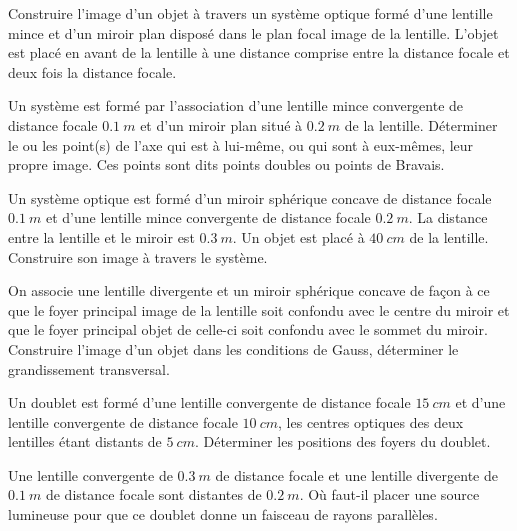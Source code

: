 %
\begin{exercice}
Construire l'image d'un objet à travers un système optique formé d'une lentille mince et d'un miroir plan disposé dans le plan focal image de la lentille. L'objet est placé en avant de la lentille à une distance comprise entre la distance focale et deux fois la distance focale.
\end{exercice}
%
\begin{exercice}
Un système est formé par l'association d'une lentille mince convergente de distance focale \(\SI{0,1}{m}\) et d'un miroir plan situé à \(\SI{0,2}{m}\) de la lentille. Déterminer le ou les point(s) de l'axe qui est à lui-même, ou qui sont à eux-mêmes, leur propre image. Ces points sont dits points doubles ou points de Bravais.
\end{exercice}
%
\begin{exercice}
Un système optique est formé d'un miroir sphérique concave de distance focale \(\SI{0,1}{m}\) et d'une lentille mince convergente de distance focale \(\SI{0,2}{m}\). La distance entre la lentille et le miroir est \(\SI{0,3}{m}\). Un objet est placé à \(\SI{40}{cm}\) de la lentille. Construire son image à travers le système.
\end{exercice}
%
\begin{exercice}
On associe une lentille divergente et un miroir sphérique concave de façon à ce que le foyer principal image de la lentille soit confondu avec le centre du miroir et que le foyer principal objet de celle-ci soit confondu avec le sommet du miroir. Construire l'image d'un objet dans les conditions de Gauss, déterminer le grandissement transversal.
\end{exercice}
%
\begin{exercice}
Un doublet est formé d'une lentille convergente de distance focale \(\SI{15}{cm}\) et d'une lentille convergente de distance focale \(\SI{10}{cm}\), les centres optiques des deux lentilles étant distants de \(\SI{5}{cm}\). Déterminer les positions des foyers du doublet.
\end{exercice}
%
\begin{exercice}
Une lentille convergente de \(\SI{0,3}{m}\) de distance focale et une lentille divergente de \(\SI{0,1}{m}\) de distance focale sont distantes de \(\SI{0,2}{m}\). Où faut-il placer une source lumineuse pour que ce doublet donne un faisceau de rayons parallèles.
\end{exercice}
